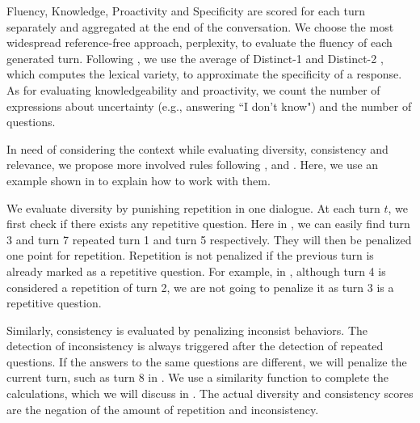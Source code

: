  
Fluency, Knowledge, Proactivity and Specificity are scored for each turn separately
and aggregated at the end of the conversation. 
We choose the most widespread reference-free approach, 
perplexity, to evaluate the fluency
of each generated turn.
Following \citet{bao2020plato}, 
we use the average of Distinct-1 and Distinct-2 \citep{li2015diversity},
which computes the lexical variety, to approximate the specificity of a response.
As for evaluating knowledgeability and proactivity, we
count the number of expressions about uncertainty (e.g., answering ``I don’t know") and the number of questions.

In need of considering the context while evaluating diversity, consistency and relevance,
we propose more involved rules following ,  and
.
Here, we use an example shown in 
to explain how to work with them.


We evaluate diversity by punishing
repetition in one dialogue.
 At each turn $t$, we first check if there exists any repetitive question.  
Here in ,
we can easily find turn 3 and turn 7 repeated turn 1 and turn 5 
respectively. They will then be penalized one point for repetition. 
Repetition is not penalized if the previous turn is already 
marked as a repetitive question. For example, in , 
although turn 4 is considered a repetition of turn 2,  
we are not going to penalize it as turn 3 is a repetitive question. 

Similarly, consistency is evaluated 
by penalizing inconsist behaviors. 
The detection of inconsistency is always triggered after the detection of repeated questions. 
If the answers to the same questions are different, we will penalize the current turn, 
such as turn 8 in . %
We use a similarity function to complete the calculations, which we will 
discuss in . The actual diversity and consistency scores
are the negation of the amount of repetition and inconsistency.

